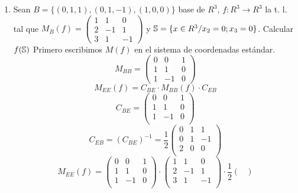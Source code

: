 \documentclass[../practica.root.tex]{subfiles}
\begin{document}
\begin{enumerate}
    \item Sean $B = \{(0,1,1),(0,1,-1),(1,0,0)\}$ base de $R^3$, $f : R^3 \to R^3$ la t. l. tal que $M_B(f)=\begin{pmatrix}
                  1 & 1 & 0 \\ 2 & -1 & 1 \\ 3 & 1 & -1
              \end{pmatrix}$ y $\S = \{x \in R^3 / x_2 = 0; x_3 = 0\}$. Calcular $f(\S)$
          Primero escribimos $M(f)$ en el sistema de coordenadas estándar.
          \[
              M_{BB} = \begin{pmatrix}
                  0 & 0  & 1 \\
                  1 & 1  & 0 \\
                  1 & -1 & 0
              \end{pmatrix}
          \] \[
              M_{EE}(f) = C_{BE}\cdot M_{BB}(f) \cdot C_{EB}
          \] \[
              C_{BE} = \begin{pmatrix}
                  0 & 0  & 1 \\
                  1 & 1  & 0 \\
                  1 & -1 & 0 \\
              \end{pmatrix}
          \]
          \[
              C_{EB} = (C_{BE})^{-1} = \frac{1}{2}\begin{pmatrix}
                  0 & 1 & 1  \\
                  0 & 1 & -1 \\
                  2 & 0 & 0  \\
              \end{pmatrix}
          \] \[
              M_{EE}(f) = \begin{pmatrix}
                  0 & 0  & 1 \\
                  1 & 1  & 0 \\
                  1 & -1 & 0 \\
              \end{pmatrix}\cdot\begin{pmatrix}
                  1 & 1  & 0  \\
                  2 & -1 & 1  \\
                  3 & 1  & -1 \\
              \end{pmatrix}\cdot \frac{1}{2}\begin{pmatrix}

\end{pmatrix}\]
\end{enumerate}
\end{document}
